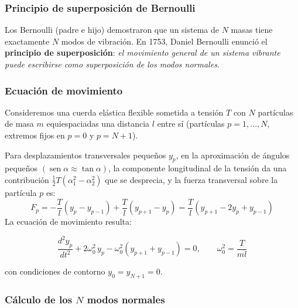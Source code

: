 \documentclass[12pt, a4paper]{article}
\theoremstyle{plain}
\theoremstyle{definition}
\theoremstyle{remark}
\DeclareMathOperator{\sen}{sen}
\begin{document}
\subsubsection{Principio de superposición de Bernoulli}

Los Bernoulli (padre e hijo) demostraron que un sistema de $N$ masas tiene exactamente
$N$ modos de vibración. En 1753, Daniel Bernoulli enunció el
\textbf{principio de superposición}: \emph{el movimiento general de un sistema vibrante
puede escribirse como superposición de los modos normales}.

\subsubsection{Ecuación de movimiento}

Consideremos una cuerda elástica flexible sometida a tensión $T$ con $N$ partículas de
masa $m$ equiespaciadas una distancia $l$ entre sí (partículas $p = 1,\ldots,N$, extremos
fijos en $p=0$ y $p=N+1$).

Para desplazamientos transversales pequeños $y_p$, en la aproximación de ángulos pequeños
$(\sen\alpha\approx\tan\alpha)$, la componente longitudinal de la tensión da una
contribución $\frac{1}{2}T(\alpha_1^2-\alpha_2^2)$ que se desprecia, y la fuerza
transversal sobre la partícula $p$ es:
\begin{equation}
  F_p = -\frac{T}{l}(y_p - y_{p-1}) + \frac{T}{l}(y_{p+1}-y_p)
      = \frac{T}{l}(y_{p+1} - 2y_p + y_{p-1})
\end{equation}
La ecuación de movimiento resulta:
\begin{mdframed}[style=resultado]
\begin{equation}
  \frac{d^2y_p}{dt^2} + 2\omega_0^2\,y_p - \omega_0^2(y_{p+1}+y_{p-1}) = 0,
  \qquad \omega_0^2 = \frac{T}{ml}
\end{equation}
\end{mdframed}
con condiciones de contorno $y_0 = y_{N+1} = 0$.

\subsubsection{Cálculo de los \texorpdfstring{$N$}{N} modos normales}
\end{document}
